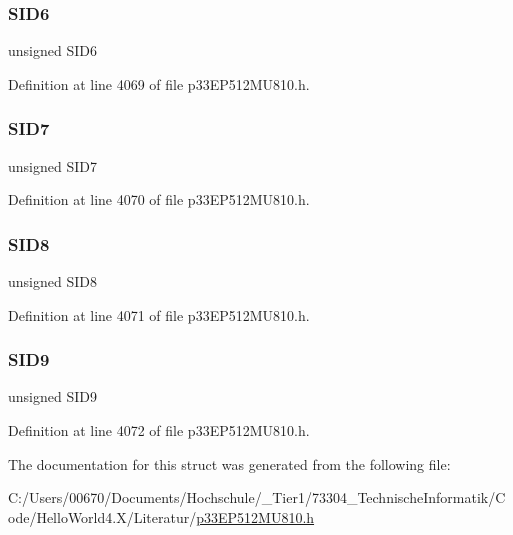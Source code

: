 \subsubsection{\texorpdfstring{S\+I\+D6}{SID6}}
{\footnotesize\ttfamily unsigned S\+I\+D6}



Definition at line 4069 of file p33\+E\+P512\+M\+U810.\+h.

\mbox{\label{structtag_c1_r_x_f6_s_i_d_b_i_t_s_a34097fb76decd431701fa2d86a22328e}} 
\subsubsection{\texorpdfstring{S\+I\+D7}{SID7}}
{\footnotesize\ttfamily unsigned S\+I\+D7}



Definition at line 4070 of file p33\+E\+P512\+M\+U810.\+h.

\mbox{\label{structtag_c1_r_x_f6_s_i_d_b_i_t_s_afe74894633244fdb0b0c01b4e8c522e7}} 
\subsubsection{\texorpdfstring{S\+I\+D8}{SID8}}
{\footnotesize\ttfamily unsigned S\+I\+D8}



Definition at line 4071 of file p33\+E\+P512\+M\+U810.\+h.

\mbox{\label{structtag_c1_r_x_f6_s_i_d_b_i_t_s_a33587704948067005c2a6a3ccc503c99}} 
\subsubsection{\texorpdfstring{S\+I\+D9}{SID9}}
{\footnotesize\ttfamily unsigned S\+I\+D9}



Definition at line 4072 of file p33\+E\+P512\+M\+U810.\+h.



The documentation for this struct was generated from the following file\+:\begin{DoxyCompactItemize}
\item 
C\+:/\+Users/00670/\+Documents/\+Hochschule/\+\_\+\+Tier1/73304\+\_\+\+Technische\+Informatik/\+Code/\+Hello\+World4.\+X/\+Literatur/\hyperlink{p33_e_p512_m_u810_8h}{p33\+E\+P512\+M\+U810.\+h}\end{DoxyCompactItemize}
